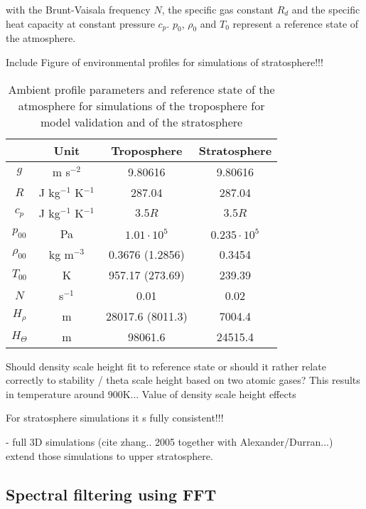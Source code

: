 with the Brunt-Vaisala frequency $N$, the specific gas constant $R_d$ and the specific heat capacity at constant pressure $c_p$. $p_0$, $\rho_0$ and $T_0$ represent a reference state of the atmosphere.

\begin{table*}[h]
\centering
\caption{Ambient profile parameters and reference state of the atmosphere for simulations of the troposphere for model validation and of the stratosphere}


Include Figure of environmental profiles for simulations of stratosphere!!!


\begin{tabular}{@{}cccc@{}}
\toprule
 & Unit & Troposphere & Stratosphere \\ \midrule[1pt]

$g$ & m s$^{-2}$ & 9.80616 & 9.80616 \\
$R$ & J kg$^{-1}$ K$^{-1}$ & 287.04 & 287.04 \\
$c_p$ & J kg$^{-1}$ K$^{-1}$ & $3.5 R$ & $3.5 R$ \\
$p_{00}$ & Pa & $1.01 \cdot 10^5$ & $0.235 \cdot 10^5$ \\
$\rho_{00}$ & kg m$^{-3}$ & 0.3676 (1.2856) & 0.3454 \\
$T_{00}$ & K & 957.17 (273.69) & 239.39 \\
$N$ & s$^{-1}$ & 0.01 & 0.02 \\
$H_{\rho}$ & m & 28017.6 (8011.3)  & 7004.4 \\
$H_{\Theta}$ & m & 98061.6 & 24515.4  \\

\bottomrule
\end{tabular}
\label{tab:ambientProfiles}
\end{table*}

Should density scale height fit to reference state or should it rather relate correctly to stability / theta scale height based on two atomic gases? This results in temperature around 900K...
Value of density scale height effects

For stratosphere simulations it s fully consistent!!! 

- full 3D simulations (cite zhang.. 2005 together with Alexander/Durran...) extend those simulations to upper stratosphere.


\subsection{Spectral filtering using FFT}

